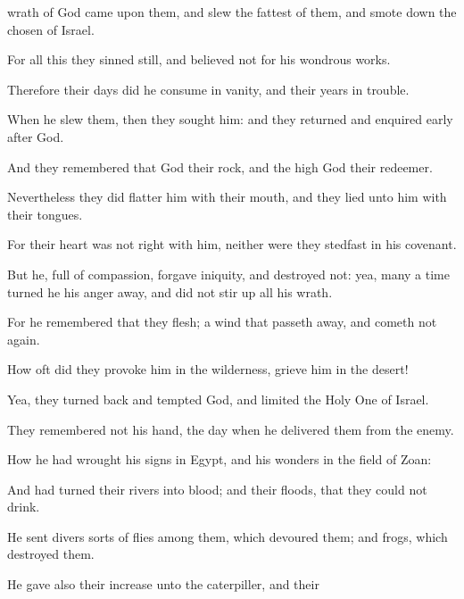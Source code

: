 {wrath of
God
came upon them, and
slew the
fattest of them, and smote
down the
chosen
{} of
Israel.
\par }{\Q {}For all this they
sinned still, and
believed not for his wondrous
works.
\par }{\Q {}Therefore their
days did he
consume in
vanity, and their
years in
trouble.
\par }{\Q {}When he
slew them, then they
sought him: and they
returned and enquired
early after
God.
\par }{\Q {}And they
remembered that
God
{} their
rock, and the
high
God their
redeemer.
\par }{\Q {}Nevertheless they did
flatter him with their
mouth, and they
lied unto him with their
tongues.
\par }{\Q {}For their
heart was not
right with him, neither were they
stedfast in his
covenant.
\par }{\Q {}But he,
{} full of
compassion,
forgave
{}
iniquity, and
destroyed
{} not: yea, many a
time
turned he his
anger
away, and did not stir
up all his
wrath.
\par }{\Q {}For he
remembered that they
{}
flesh; a
wind that passeth
away, and cometh not
again.
\par }{\BB \par }{\Q {}How oft did they
provoke him in the
wilderness,
{}
grieve him in the
desert!
\par }{\Q {}Yea, they turned
back and
tempted
God, and
limited the Holy
One of
Israel.
\par }{\Q {}They
remembered not his
hand,
{} the
day when he
delivered them from the
enemy.
\par }{\Q {}How he had
wrought his
signs in
Egypt, and his
wonders in the
field of
Zoan:
\par }{\Q {}And had
turned their
rivers into
blood; and their
floods, that they could not
drink.
\par }{\Q {}He
sent divers sorts of
flies among them, which
devoured them; and
frogs, which
destroyed them.
\par }{\Q {}He
gave also their
increase unto the
caterpiller, and their
}
